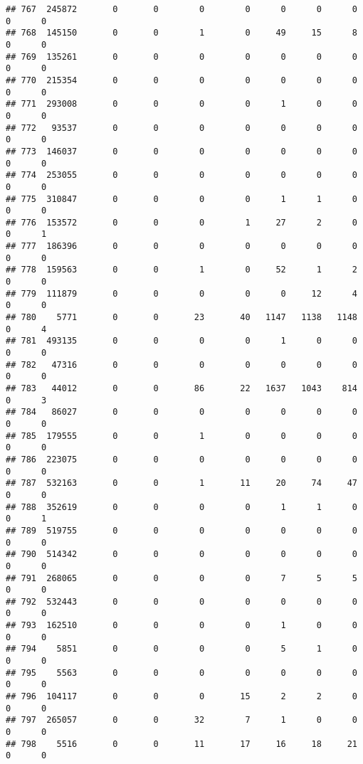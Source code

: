 \documentclass[
]{article}
\begin{document}
\begin{verbatim}
## 767  245872       0       0        0        0      0      0      0     0      0
## 768  145150       0       0        1        0     49     15      8     0      0
## 769  135261       0       0        0        0      0      0      0     0      0
## 770  215354       0       0        0        0      0      0      0     0      0
## 771  293008       0       0        0        0      1      0      0     0      0
## 772   93537       0       0        0        0      0      0      0     0      0
## 773  146037       0       0        0        0      0      0      0     0      0
## 774  253055       0       0        0        0      0      0      0     0      0
## 775  310847       0       0        0        0      1      1      0     0      0
## 776  153572       0       0        0        1     27      2      0     0      1
## 777  186396       0       0        0        0      0      0      0     0      0
## 778  159563       0       0        1        0     52      1      2     0      0
## 779  111879       0       0        0        0      0     12      4     0      0
## 780    5771       0       0       23       40   1147   1138   1148     0      4
## 781  493135       0       0        0        0      1      0      0     0      0
## 782   47316       0       0        0        0      0      0      0     0      0
## 783   44012       0       0       86       22   1637   1043    814     0      3
## 784   86027       0       0        0        0      0      0      0     0      0
## 785  179555       0       0        1        0      0      0      0     0      0
## 786  223075       0       0        0        0      0      0      0     0      0
## 787  532163       0       0        1       11     20     74     47     0      0
## 788  352619       0       0        0        0      1      1      0     0      1
## 789  519755       0       0        0        0      0      0      0     0      0
## 790  514342       0       0        0        0      0      0      0     0      0
## 791  268065       0       0        0        0      7      5      5     0      0
## 792  532443       0       0        0        0      0      0      0     0      0
## 793  162510       0       0        0        0      1      0      0     0      0
## 794    5851       0       0        0        0      5      1      0     0      0
## 795    5563       0       0        0        0      0      0      0     0      0
## 796  104117       0       0        0       15      2      2      0     0      0
## 797  265057       0       0       32        7      1      0      0     0      0
## 798    5516       0       0       11       17     16     18     21     0      0

\end{verbatim}
\end{document}

